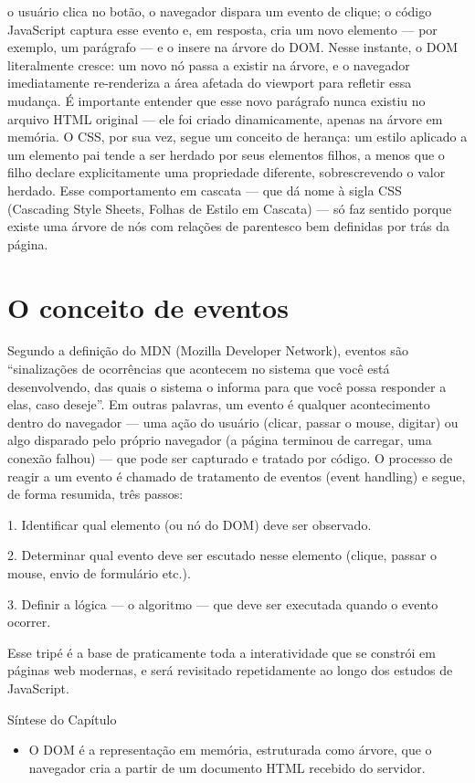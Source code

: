 o usuário clica no botão, o navegador dispara um evento de clique; o código JavaScript captura esse evento e, em resposta, cria um novo elemento — por exemplo, um parágrafo — e o insere na árvore do DOM. Nesse instante, o DOM literalmente cresce: um novo nó passa a existir na árvore, e o navegador imediatamente re-renderiza a área afetada do viewport para refletir essa mudança. É importante entender que esse novo parágrafo nunca existiu no arquivo HTML original — ele foi criado dinamicamente, apenas na árvore em memória. O CSS, por sua vez, segue um conceito de herança: um estilo aplicado a um elemento pai tende a ser herdado por seus elementos filhos, a menos que o filho declare explicitamente uma propriedade diferente, sobrescrevendo o valor herdado. Esse comportamento em cascata — que dá nome à sigla CSS (Cascading Style Sheets, Folhas de Estilo em Cascata) — só faz sentido porque existe uma árvore de nós com relações de parentesco bem definidas por trás da página.

\section{O conceito de eventos}

Segundo a definição do MDN (Mozilla Developer Network), eventos são “sinalizações de ocorrências que acontecem no sistema que você está desenvolvendo, das quais o sistema o informa para que você possa responder a elas, caso deseje”. Em outras palavras, um evento é qualquer acontecimento dentro do navegador — uma ação do usuário (clicar, passar o mouse, digitar) ou algo disparado pelo próprio navegador (a página terminou de carregar, uma conexão falhou) — que pode ser capturado e tratado por código. O processo de reagir a um evento é chamado de tratamento de eventos (event handling) e segue, de forma resumida, três passos:

1. Identificar qual elemento (ou nó do DOM) deve ser observado.

2. Determinar qual evento deve ser escutado nesse elemento (clique, passar o mouse, envio de formulário etc.).

3. Definir a lógica — o algoritmo — que deve ser executada quando o evento ocorrer.

Esse tripé é a base de praticamente toda a interatividade que se constrói em páginas web modernas, e será revisitado repetidamente ao longo dos estudos de JavaScript.

Síntese do Capítulo

\begin{itemize}
  \item O DOM é a representação em memória, estruturada como árvore, que o navegador cria a partir de um documento HTML recebido do servidor.
\end{itemize}

